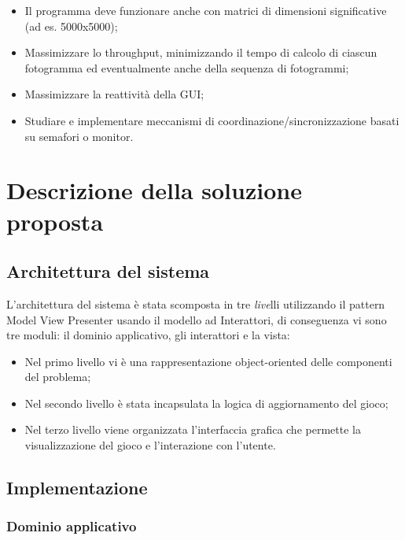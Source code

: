 ﻿\documentclass[a4paper]{article}
\begin{document}
\begin{itemize}
\item
  Il programma deve funzionare anche con matrici di dimensioni significative (ad es. 5000x5000);
\item
  Massimizzare lo throughput, minimizzando il tempo di calcolo di ciascun fotogramma ed eventualmente anche della sequenza di fotogrammi;
\item
  Massimizzare la reattività della GUI;
\item
  Studiare e implementare meccanismi di coordinazione/sincronizzazione basati su semafori o monitor.
\end{itemize}

\section{Descrizione della soluzione
proposta}\label{descrizione-della-soluzione-proposta}

\subsection{Architettura del sistema}\label{architettura-del-sistema}

L'architettura del sistema è stata scomposta in tre \emph{live}lli utilizzando il pattern Model View Presenter usando il modello ad Interattori, di conseguenza vi sono tre moduli: il dominio applicativo, gli interattori e la vista:

\begin{itemize}
\item
  Nel primo livello vi è una rappresentazione object-oriented delle componenti del problema;
\item
  Nel secondo livello è stata incapsulata la logica di aggiornamento del gioco;
\item
  Nel terzo livello viene organizzata l'interfaccia grafica che permette la visualizzazione del gioco e l'interazione con l'utente.
\end{itemize}

\subsection{Implementazione}\label{implementazione}

\subsubsection{Dominio applicativo}\label{dominio-applicativo}
\end{document}
